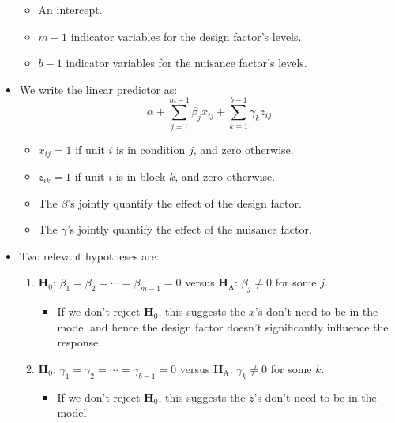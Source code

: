 \begin{itemize}
            \begin{itemize}
                  \item An intercept.
                  \item $ m-1 $ indicator variables for the design factor's levels.
                  \item $ b-1 $ indicator variables for the nuisance factor's levels.
            \end{itemize}
      \item We write the linear predictor as:
            \begin{equation}\tag{$\star$}
                  \alpha+\sum_{j=1}^{m-1} \beta_j x_{ij}+\sum_{k=1}^{b-1} \gamma_k z_{ij}\label{lpeqn}
            \end{equation}
            \begin{itemize}
                  \item $ x_{ij}=1 $ if unit $ i $ is in condition $ j $, and zero otherwise.
                  \item $ z_{ik}=1 $ if unit $ i $ is in block $ k $, and zero otherwise.
                  \item The $ \beta $'s jointly quantify the effect of the design factor.
                  \item The $ \gamma $'s jointly quantify the effect of the nuisance factor.
            \end{itemize}
      \item Two relevant hypotheses are:
            \begin{enumerate}[(1)]
                  \item $ \mathbf{H}_0 $: $ \beta_1=\beta_2=\cdots=\beta_{m-1}=0 $ versus $ \mathbf{H}_\text{A} $: $ \beta_j\ne 0 $ for some $ j $.
                        \begin{itemize}
                              \item If we don't reject $ \mathbf{H}_0 $, this suggests the $ x $'s don't need to be in the model
                                    and hence the design factor doesn't significantly influence the response.
                        \end{itemize}
                  \item $ \mathbf{H}_0 $: $ \gamma_1=\gamma_2=\cdots=\gamma_{b-1}=0 $ versus $ \mathbf{H}_\text{A} $: $ \gamma_k\ne 0 $ for some $ k $.
                        \begin{itemize}
                              \item If we don't reject $ \mathbf{H}_0 $, this suggests the $ z $'s don't need to be in the model

\end{itemize}
\end{enumerate}
\end{itemize}
